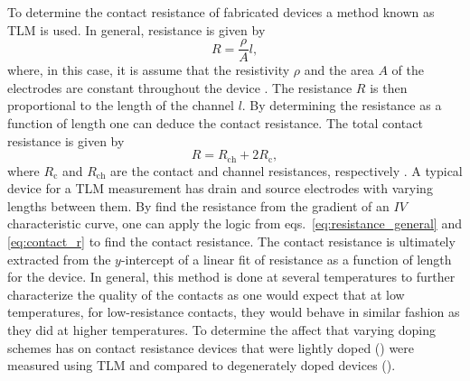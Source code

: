 To determine the contact resistance of fabricated devices a method known as \ac{TLM} is used. In general, resistance is given by
\begin{equation}\label{eq:resistance_general}
	R = \frac{\rho}{A}l,
\end{equation}
where, in this case, it is assume that the resistivity $\rho$ and the area $A$ of the electrodes are constant throughout the device \cite{Schroder_Semiconductor2006}. The resistance $R$ is then proportional to the length of the channel $l$. By determining the resistance as a function of length one can deduce the contact resistance. The total contact resistance is given by
\begin{equation}\label{eq:contact_r}
	R = R_\mathrm{ch} + 2R_\mathrm{c},
\end{equation} 
where $R_\mathrm{c}$ and $R_\mathrm{ch}$ are the contact and channel resistances, respectively \cite{Schroder_Semiconductor2006}. A typical device for a \acs{TLM} measurement has drain and source electrodes with varying lengths between them. By find the resistance from the gradient of an $IV$ characteristic curve, one can apply the logic from eqs.~\ref{eq:resistance_general} and \ref{eq:contact_r} to find the contact resistance. The contact resistance is ultimately extracted from the $y$-intercept of a linear fit of resistance as a function of length for the device. In general, this method is done at several temperatures to further characterize the quality of the contacts as one would expect that at low temperatures, for low-resistance contacts, they would behave in similar fashion as they did at higher temperatures. To determine the affect that varying doping schemes has on contact resistance devices that were lightly doped (\lightlyfive) were measured using \acs{TLM} and compared to degenerately doped devices (\degenerate).

